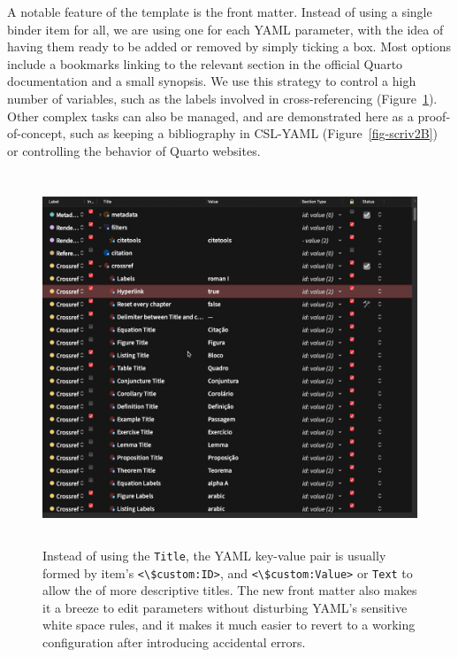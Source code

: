 \documentclass[
  12pt,
  a4paper,
  oneside,
  numbers=noenddot,
  titlepage,
  toclink=all,
  toc=bibliography]{scrbook}
\theoremstyle{definition}
\theoremstyle{definition}
\theoremstyle{definition}
\theoremstyle{plain}
\theoremstyle{plain}
\theoremstyle{plain}
\theoremstyle{plain}
\theoremstyle{plain}
\theoremstyle{remark}
\begin{document}
A notable feature of the template is the front matter. Instead of using
a single binder item for all, we are using one for each YAML parameter,
with the idea of having them ready to be added or removed by simply
ticking a box. Most options include a bookmarks linking to the relevant
section in the official Quarto documentation and a small synopsis. We
use this strategy to control a high number of variables, such as the
labels involved in cross-referencing
(\protect\hypertarget{cite_2}{}{\label{cite_2}Figure~\ref{fig-scriv2A}}).
Other complex tasks can also be managed, and are demonstrated here as a
proof-of-concept, such as keeping a bibliography in CSL-YAML
(\protect\hypertarget{cite_3}{}{\label{cite_3}Figure~\ref{fig-scriv2B}})
or controlling the behavior of Quarto websites.

\begin{figure}

{\centering \includegraphics[width=5.20833in,height=4.36458in]{crossref.png}

}

\caption{\label{fig-scriv2A}Instead of using the \texttt{Title}, the
YAML key-value pair is usually formed by item's
\texttt{\textless{}\textbackslash{}\$custom:ID\textgreater{}}, and
\texttt{\textless{}\textbackslash{}\$custom:Value\textgreater{}} or
\texttt{Text} to allow the of more descriptive titles. The new front
matter also makes it a breeze to edit parameters without disturbing
YAML's sensitive white space rules, and it makes it much easier to
revert to a working configuration after introducing accidental errors.}

\end{figure}
\end{document}
